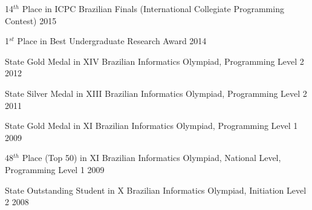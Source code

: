 
14$^{th}$ Place in ICPC Brazilian Finals (International Collegiate Programming Contest) \hfill 2015

1$^{st}$ Place in Best Undergraduate Research Award \hfill 2014

State Gold Medal in XIV Brazilian Informatics Olympiad, Programming Level 2 \hfill 2012

State Silver Medal in XIII Brazilian Informatics Olympiad, Programming Level 2 \hfill 2011

State Gold Medal in XI Brazilian Informatics Olympiad, Programming Level 1 \hfill 2009

48$^{th}$ Place (Top 50) in XI Brazilian Informatics Olympiad, National Level, Programming Level 1 \hfill 2009

State Outstanding Student in X Brazilian Informatics Olympiad, Initiation Level 2 \hfill 2008

